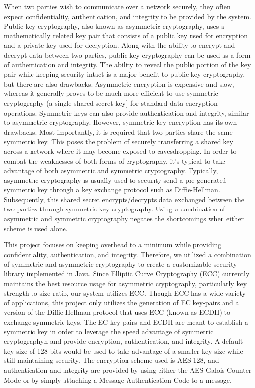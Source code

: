 When two parties wish to communicate over a network securely, they often expect confidentiality, authentication, and integrity to be provided by the system. Public-key cryptography, also known as asymmetric cryptography, uses a mathematically related key pair that consists of a public key used for encryption and a private key used for decryption. Along with the ability to encrypt and decrypt data between two parties, public-key cryptography can be used as a form of authentication and integrity. The ability to reveal the public portion of the key pair while keeping security intact is a major benefit to public key cryptography, but there are also drawbacks. Asymmetric encryption is expensive and slow, whereas it generally proves to be much more efficient to use symmetric cryptography (a single shared secret key) for standard data encryption operations. Symmetric keys can also provide authentication and integrity, similar to asymmetric cryptography. However, symmetric key encryption has its own drawbacks. Most importantly, it is required that two parties share the same symmetric key. This poses the problem of securely transferring a shared key across a network where it may become exposed to eavesdropping. In order to combat the weaknesses of both forms of cryptography, it's typical to take advantage of both asymmetric and symmetric cryptography. Typically, asymmetric cryptography is usually used to security send a pre-generated symmetric key through a key exchange protocol such as Diffie-Hellman. Subsequently, this shared secret encrypts/decrypts data exchanged between the two parties through symmetric key cryptography. Using a combination of asymmetric and symmetric cryptography negates the shortcomings when either scheme is used alone.

This project focuses on keeping overhead to a minimum while providing confidentiality, authentication, and integrity. Therefore, we utilized a combination of symmetric and asymmetric cryptography to create a customizable security library implemented in Java. Since Elliptic Curve Cryptography (ECC) currently maintains the best resource usage for asymmetric cryptography, particularly key strength to size ratio, our system utilizes ECC. Though ECC has a wide variety of applications, this project only utilizes the generation of EC key-pairs and a version of the Diffie-Hellman protocol that uses ECC (known as ECDH) to exchange symmetric keys. The EC key-pairs and ECDH are meant to establish a symmetric key in order to leverage the speed advantage of symmetric cryptographyn and provide encryption, authentication, and integrity. A default key size of 128 bits would be used to take advantage of a smaller key size while still maintaining security. The encryption scheme used  is AES-128, and  authentication and integrity are provided by using either the AES Galois Counter Mode or by simply attaching a Message Authentication Code to a message.  

